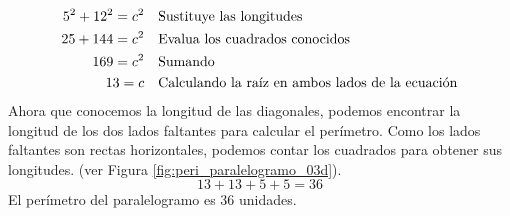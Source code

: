 \begin{solutionbox}{16cm}
\begin{minipage}{0.55\textwidth}
\begin{align*}
            5^2+12^2  =c^2 & \text{\quad Sustituye las longitudes}                         \\
            25 +144 =c^2   & \text{\quad Evalua los cuadrados conocidos}                   \\
            169=c^2        & \text{\quad Sumando }                                         \\
            13=c           & \text{\quad Calculando la raíz en ambos lados de la ecuación} \\
        \end{align*}
        Ahora que conocemos la longitud de las diagonales, podemos encontrar la longitud de los dos lados faltantes para calcular el perímetro.
        Como los lados faltantes son rectas horizontales, podemos contar los cuadrados para obtener sus longitudes. (ver Figura \ref{fig:peri_paralelogramo_03d}).
        \[13+13+5+5=36\]
        El perímetro del paralelogramo es 36 unidades.
    \end{minipage}
\end{solutionbox}
